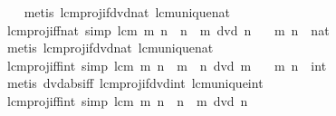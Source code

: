\begin{isabellebody}
%
\isadelimproof
\ \ %
\endisadelimproof
%
\isatagproof
{}\isamarkupfalse%
\ {\isacharparenleft}{\kern0pt}metis\ lcm{\isacharunderscore}{\kern0pt}proj{}{\isacharunderscore}{\kern0pt}if{\isacharunderscore}{\kern0pt}dvd{\isacharunderscore}{\kern0pt}nat\ lcm{\isacharunderscore}{\kern0pt}unique{\isacharunderscore}{\kern0pt}nat{\isacharparenright}{\kern0pt}%
\endisatagproof
{\isafoldproof}%
%
\isadelimproof
\isanewline
%
\endisadelimproof
\isanewline
{}\isamarkupfalse%
\ lcm{\isacharunderscore}{\kern0pt}proj{}{\isacharunderscore}{\kern0pt}iff{\isacharunderscore}{\kern0pt}nat\ {\isacharbrackleft}{\kern0pt}simp{\isacharbrackright}{\kern0pt}{\isacharcolon}{\kern0pt}\ {\isachardoublequoteopen}lcm\ m\ n\ {\isacharequal}{\kern0pt}\ n\ {\isasymlongleftrightarrow}\ m\ dvd\ n{\isachardoublequoteclose}\isanewline
\ \ \ m\ n\ {\isacharcolon}{\kern0pt}{\isacharcolon}{\kern0pt}\ nat\isanewline
%
\isadelimproof
\ \ %
\endisadelimproof
%
\isatagproof
{}\isamarkupfalse%
\ {\isacharparenleft}{\kern0pt}metis\ lcm{\isacharunderscore}{\kern0pt}proj{}{\isacharunderscore}{\kern0pt}if{\isacharunderscore}{\kern0pt}dvd{\isacharunderscore}{\kern0pt}nat\ lcm{\isacharunderscore}{\kern0pt}unique{\isacharunderscore}{\kern0pt}nat{\isacharparenright}{\kern0pt}%
\endisatagproof
{\isafoldproof}%
%
\isadelimproof
\isanewline
%
\endisadelimproof
\isanewline
{}\isamarkupfalse%
\ lcm{\isacharunderscore}{\kern0pt}proj{}{\isacharunderscore}{\kern0pt}iff{\isacharunderscore}{\kern0pt}int\ {\isacharbrackleft}{\kern0pt}simp{\isacharbrackright}{\kern0pt}{\isacharcolon}{\kern0pt}\ {\isachardoublequoteopen}lcm\ m\ n\ {\isacharequal}{\kern0pt}\ {\isasymbar}m{\isasymbar}\ {\isasymlongleftrightarrow}\ n\ dvd\ m{\isachardoublequoteclose}\isanewline
\ \ \ m\ n\ {\isacharcolon}{\kern0pt}{\isacharcolon}{\kern0pt}\ int\isanewline
%
\isadelimproof
\ \ %
\endisadelimproof
%
\isatagproof
{}\isamarkupfalse%
\ {\isacharparenleft}{\kern0pt}metis\ dvd{\isacharunderscore}{\kern0pt}abs{\isacharunderscore}{\kern0pt}iff\ lcm{\isacharunderscore}{\kern0pt}proj{}{\isacharunderscore}{\kern0pt}if{\isacharunderscore}{\kern0pt}dvd{\isacharunderscore}{\kern0pt}int\ lcm{\isacharunderscore}{\kern0pt}unique{\isacharunderscore}{\kern0pt}int{\isacharparenright}{\kern0pt}%
\endisatagproof
{\isafoldproof}%
%
\isadelimproof
\isanewline
%
\endisadelimproof
\isanewline
{}\isamarkupfalse%
\ lcm{\isacharunderscore}{\kern0pt}proj{}{\isacharunderscore}{\kern0pt}iff{\isacharunderscore}{\kern0pt}int\ {\isacharbrackleft}{\kern0pt}simp{\isacharbrackright}{\kern0pt}{\isacharcolon}{\kern0pt}\ {\isachardoublequoteopen}lcm\ m\ n\ {\isacharequal}{\kern0pt}\ {\isasymbar}n{\isasymbar}\ {\isasymlongleftrightarrow}\ m\ dvd\ n{\isachardoublequoteclose}\isanewline

\end{isabellebody}
